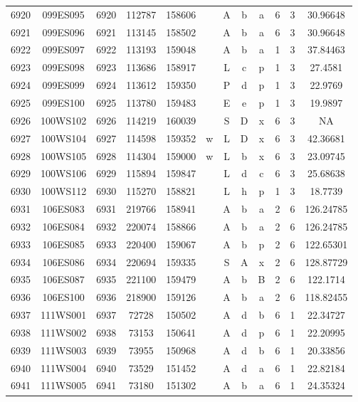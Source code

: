 \begin{tabular}{|*{12}{c|}}
6920 & 099ES095 & 6920 & 112787 & 158606 &  & A & b & a & 6 & 3 & 30.96648 \\ 
6921 & 099ES096 & 6921 & 113145 & 158502 &  & A & b & a & 6 & 3 & 30.96648 \\ 
6922 & 099ES097 & 6922 & 113193 & 159048 &  & A & b & a & 1 & 3 & 37.84463 \\ 
6923 & 099ES098 & 6923 & 113686 & 158917 &  & L & c & p & 1 & 3 & 27.4581 \\ 
6924 & 099ES099 & 6924 & 113612 & 159350 &  & P & d & p & 1 & 3 & 22.9769 \\ 
6925 & 099ES100 & 6925 & 113780 & 159483 &  & E & e & p & 1 & 3 & 19.9897 \\ 
6926 & 100WS102 & 6926 & 114219 & 160039 &  & S & D & x & 6 & 3 & NA \\ 
6927 & 100WS104 & 6927 & 114598 & 159352 & w & L & D & x & 6 & 3 & 42.36681 \\ 
6928 & 100WS105 & 6928 & 114304 & 159000 & w & L & b & x & 6 & 3 & 23.09745 \\ 
6929 & 100WS106 & 6929 & 115894 & 159847 &  & L & d & c & 6 & 3 & 25.68638 \\ 
6930 & 100WS112 & 6930 & 115270 & 158821 &  & L & h & p & 1 & 3 & 18.7739 \\ 
6931 & 106ES083 & 6931 & 219766 & 158941 &  & A & b & a & 2 & 6 & 126.24785 \\ 
6932 & 106ES084 & 6932 & 220074 & 158866 &  & A & b & a & 2 & 6 & 126.24785 \\ 
6933 & 106ES085 & 6933 & 220400 & 159067 &  & A & b & p & 2 & 6 & 122.65301 \\ 
6934 & 106ES086 & 6934 & 220694 & 159335 &  & S & A & x & 2 & 6 & 128.87729 \\ 
6935 & 106ES087 & 6935 & 221100 & 159479 &  & A & b & B & 2 & 6 & 122.1714 \\ 
6936 & 106ES100 & 6936 & 218900 & 159126 &  & A & b & a & 2 & 6 & 118.82455 \\ 
6937 & 111WS001 & 6937 & 72728 & 150502 &  & A & d & b & 6 & 1 & 22.34727 \\ 
6938 & 111WS002 & 6938 & 73153 & 150641 &  & A & d & p & 6 & 1 & 22.20995 \\ 
6939 & 111WS003 & 6939 & 73955 & 150968 &  & A & d & b & 6 & 1 & 20.33856 \\ 
6940 & 111WS004 & 6940 & 73529 & 151452 &  & A & d & a & 6 & 1 & 22.82184 \\ 
6941 & 111WS005 & 6941 & 73180 & 151302 &  & A & b & a & 6 & 1 & 24.35324 \\ 

\end{tabular}
